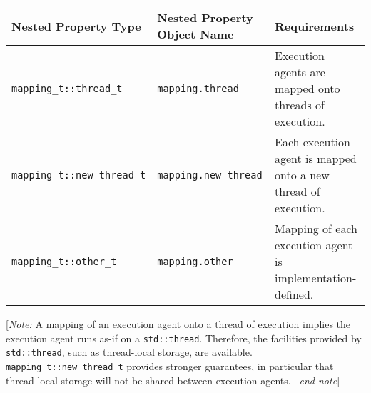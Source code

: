 \documentclass[a4paper,12pt,notitlepage,twoside,openright]{article}
\begin{document}
\begin{longtable}[]{@{}lll@{}}
\toprule
\begin{minipage}[b]{0.32\columnwidth}\raggedright
Nested Property Type\strut
\end{minipage} & \begin{minipage}[b]{0.42\columnwidth}\raggedright
Nested Property Object Name\strut
\end{minipage} & \begin{minipage}[b]{0.18\columnwidth}\raggedright
Requirements\strut
\end{minipage}\tabularnewline
\midrule
\endhead
\begin{minipage}[t]{0.32\columnwidth}\raggedright
\texttt{mapping_t::thread_t}\strut
\end{minipage} & \begin{minipage}[t]{0.42\columnwidth}\raggedright
\texttt{mapping.thread}\strut
\end{minipage} & \begin{minipage}[t]{0.18\columnwidth}\raggedright
Execution agents are mapped onto threads of execution.\strut
\end{minipage}\tabularnewline
\begin{minipage}[t]{0.32\columnwidth}\raggedright
\texttt{mapping_t::new_thread_t}\strut
\end{minipage} & \begin{minipage}[t]{0.42\columnwidth}\raggedright
\texttt{mapping.new_thread}\strut
\end{minipage} & \begin{minipage}[t]{0.18\columnwidth}\raggedright
Each execution agent is mapped onto a new thread of execution.\strut
\end{minipage}\tabularnewline
\begin{minipage}[t]{0.32\columnwidth}\raggedright
\texttt{mapping_t::other_t}\strut
\end{minipage} & \begin{minipage}[t]{0.42\columnwidth}\raggedright
\texttt{mapping.other}\strut
\end{minipage} & \begin{minipage}[t]{0.18\columnwidth}\raggedright
Mapping of each execution agent is implementation-defined.\strut
\end{minipage}\tabularnewline
\bottomrule
\end{longtable}

{[}\emph{Note:} A mapping of an execution agent onto a thread of
execution implies the execution agent runs as-if on a
\texttt{std::thread}. Therefore, the facilities provided by
\texttt{std::thread}, such as thread-local storage, are
available. \texttt{mapping_t::new_thread_t} provides
stronger guarantees, in particular that thread-local storage will not be
shared between execution agents. \emph{--end note}{]}
\end{document}

